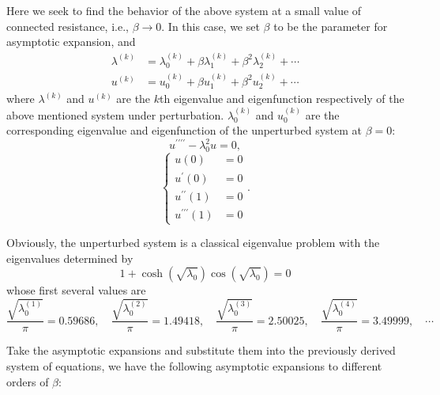 \documentclass{article}
\begin{document}
Here we seek to find the behavior of the above system at a small value of connected resistance, i.e., $\beta \to 0$. In this case, we set $\beta$ to be the parameter for asymptotic expansion, and 
\begin{equation}
    \begin{aligned}
        \lambda^{(k)} &= \lambda_0^{(k)} + \beta \lambda_1^{(k)} + \beta^2 \lambda_2^{(k)} + \cdots \\
        u^{(k)} &= u_0^{(k)} + \beta u_1^{(k)} + \beta^2 u_2^{(k)} + \cdots
    \end{aligned}
\end{equation}
where $\lambda^{(k)}$ and $u^{(k)}$ are the $k$th eigenvalue and eigenfunction respectively of the above mentioned system under perturbation. $\lambda_0^{(k)}$ and $u_0^{(k)}$ are the corresponding eigenvalue and eigenfunction of the unperturbed system at $\beta = 0$:
\begin{equation}
    u^{\prime\prime\prime\prime} - \lambda_0^2 u = 0,
\end{equation}
\begin{equation}
    \left\{\begin{aligned}
        u(0) &= 0 \\
        u^\prime(0) &= 0 \\
        u^{\prime\prime}(1) &= 0 \\
        u^{\prime\prime\prime}(1) &= 0
    \end{aligned}\right..
\end{equation}

Obviously, the unperturbed system is a classical eigenvalue problem with the eigenvalues determined by 
\begin{equation}
    1 + \cosh(\sqrt{\lambda_0}) \cos(\sqrt{\lambda_0}) = 0
\end{equation}
whose first several values are
\begin{equation}
    \frac{ \sqrt{\lambda_0^{(1)}} }{\pi} = 0.59686,\quad \frac{ \sqrt{\lambda_0^{(2)}} }{\pi} = 1.49418,\quad \frac{ \sqrt{\lambda_0^{(3)}} }{\pi} = 2.50025,\quad \frac{ \sqrt{\lambda_0^{(4)}} }{\pi} = 3.49999, \quad \cdots
\end{equation}


Take the asymptotic expansions and substitute them into the previously derived system of equations, we have the following asymptotic expansions to different orders of $\beta$:
\end{document}
